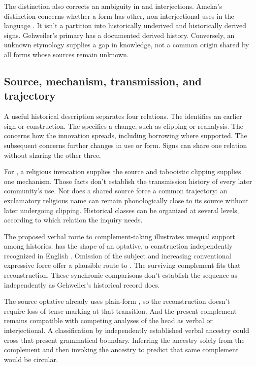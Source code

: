 \documentclass[12pt]{article}
\begin{document}
The distinction also corrects an ambiguity in  and
 interjections. Ameka's distinction concerns whether
a form has other, non-interjectional uses in the language
\citep[105--106]{ameka1992}. It isn't a partition into historically
underived and historically derived signs. Gehweiler's primary
 has a documented derived history. Conversely, an unknown
etymology supplies a gap in knowledge, not a common origin shared by
all forms whose sources remain unknown.

\subsection{Source, mechanism, transmission, and trajectory}

A useful historical description separates four relations. The
 identifies an earlier sign or construction. The
 specifies a change, such as clipping or reanalysis.
The  concerns how the innovation spreads,
including borrowing where supported. The subsequent 
concerns further changes in use or form. Signs can share one relation
without sharing the other three.

For , a religious invocation supplies the source and
tabooistic clipping supplies one mechanism. Those facts don't establish
the transmission history of every later community's use. Nor does a
shared source force a common trajectory: an exclamatory religious name
can remain phonologically close to its source without later undergoing
clipping. Historical classes can be organized at several
levels, according to which relation the inquiry needs.

The proposed verbal route to complement-taking  illustrates
unequal support among histories.  has the shape
of an optative, a construction independently recognized in English
\citep[944]{HuddlestonPullum2002}. Omission of the subject and increasing
conventional expressive force offer a plausible route to . The surviving complement fits that reconstruction. These synchronic
comparisons don't establish the sequence as independently as Gehweiler's
historical record does.

The source optative already uses plain-form , so the
reconstruction doesn't require loss of tense marking at that transition.
And the present complement remains compatible with competing analyses
of the head as verbal or interjectional. A classification by independently
established verbal ancestry could cross that present grammatical boundary.
Inferring the ancestry solely from the complement and then invoking
the ancestry to predict that same complement would be circular.
\end{document}
